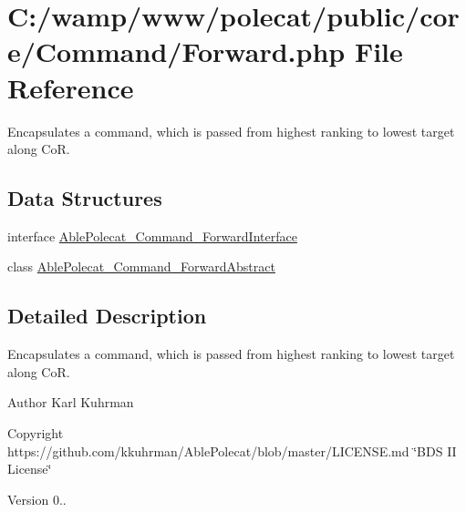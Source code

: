 \hypertarget{_forward_8php}{}\section{C\+:/wamp/www/polecat/public/core/\+Command/\+Forward.php File Reference}
\label{_forward_8php}


Encapsulates a command, which is passed from highest ranking to lowest target along Co\+R.  


\subsection*{Data Structures}
\begin{DoxyCompactItemize}
\item 
interface \hyperlink{interface_able_polecat___command___forward_interface}{Able\+Polecat\+\_\+\+Command\+\_\+\+Forward\+Interface}
\item 
class \hyperlink{class_able_polecat___command___forward_abstract}{Able\+Polecat\+\_\+\+Command\+\_\+\+Forward\+Abstract}
\end{DoxyCompactItemize}


\subsection{Detailed Description}
Encapsulates a command, which is passed from highest ranking to lowest target along Co\+R. 

\begin{DoxyAuthor}{Author}
Karl Kuhrman 
\end{DoxyAuthor}
\begin{DoxyCopyright}{Copyright}
https\+://github.com/kkuhrman/\+Able\+Polecat/blob/master/\+L\+I\+C\+E\+N\+S\+E.\+md \char`\"{}\+B\+D\+S I\+I License\char`\"{} 
\end{DoxyCopyright}
\begin{DoxyVersion}{Version}
0.. 
\end{DoxyVersion}
